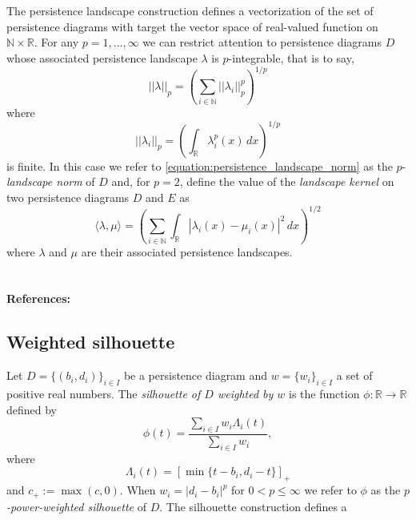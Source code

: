 \documentclass{amsart}
\begin{document}
	The persistence landscape construction defines a
	vectorization of the set of persistence diagrams with target the vector space of real-valued function on $\mathbb N \times \mathbb R$. For any $p = 1,\dots,\infty$ we can restrict attention to persistence diagrams $D$ whose associated persistence landscape $\lambda$ is
	$p$-integrable, that is to say,	
	\begin{equation} \label{equation:persistence_landscape_norm}	
	||\lambda||_p = \left( \sum_{i \in \mathbb N} ||\lambda_i||^p_p \right)^{1/p}	
	\end{equation}	
	where
	\begin{equation*}	
	||\lambda_i||_p = \left( \int_{\mathbb R} \lambda_i^p(x)\, dx \right)^{1/p}	
	\end{equation*}	
	is finite. In this case we refer to \eqref{equation:persistence_landscape_norm} as the $p$-\textit{landscape norm} of $D$ and, for $p = 2$, define the value of the \textit{landscape kernel} on two persistence diagrams $D$ and $E$ as
	\begin{equation*}
	\langle \lambda, \mu \rangle = \left(\sum_{i \in \mathbb N} \int_{\mathbb R} |\lambda_i(x) - \mu_i(x)|^2\, dx\right)^{1/2}
	\end{equation*}
	where $\lambda$ and $\mu$ are their associated persistence landscapes.

	\paragraph{\\ References:} \cite{bubenik2015statistical}
	
	\subsection*{Weighted silhouette} \label{weighted_silhouette}
	
	Let $D = \{(b_i, d_i)\}_{i \in I}$ be a
	persistence diagram and $w = \{w_i\}_{i \in I}$ a set of positive real numbers. The \textit{silhouette of $D$ weighted by $w$} is the function $\phi : \mathbb R \to \mathbb R$ defined by	
	\begin{equation*}	
	\phi(t) = \frac{\sum_{i \in I}w_i \Lambda_i(t)}{\sum_{i \in I}w_i},	
	\end{equation*}	
	where	
	\begin{equation*}
	\Lambda_i(t) = \left[ \min \{t-b_i, d_i-t\}\right]_+	
	\end{equation*}	
	and $c_+ := \max(c,0)$. When $w_i = \vert d_i - b_i \vert^p$ for $0 < p \leq \infty$ we refer to $\phi$ as the \textit{$p$-power-weighted silhouette} of $D$. The silhouette construction defines a
\end{document}
